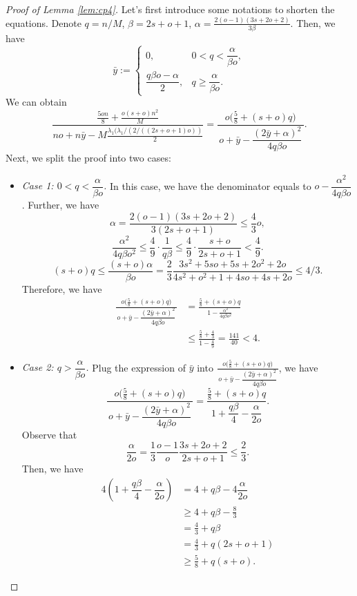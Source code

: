 \documentclass[10pt,a4paper]{amsart}
\begin{document}
\begin{proof}[Proof of Lemma \ref{lem:cp4}]
    Let's first introduce some notations to shorten the equations. Denote $q=n/M$, $\beta=2s+o+1$, $\alpha = \frac{2(o-1)(3s+2o+2)}{3\beta}$. Then, we have 
    $$
    \bar y :=
\begin{cases}
0, & 0<q<\dfrac{\alpha}{\beta o},\\[6pt]
\dfrac{q\beta o-\alpha}{2}, & q\ge \dfrac{\alpha}{\beta o}.
\end{cases} $$ 
We can obtain
\[
\frac{\frac{5 o n}{8}+\frac{o(s+o)n^2}{M}}{no + n \bar y - M \frac{\lambda_1(\lambda_1/(2/((2s+o+1)o))}{2}} = \frac{o\bigl(\tfrac58 +(s+o)q\bigr)}
        {\,o+\bar y-
          \dfrac{(2\bar y+\alpha)^{2}}{4q\beta o}\,}.
\]
Next, we split the proof into two cases:
\begin{itemize}
    \item \textit{Case 1: $0<q<\dfrac{\alpha}{\beta o}$. } In this case, we have the denominator equals to $o-
          \dfrac{\alpha^{2}}{4q\beta o}$. Further, we have
    \[
    \alpha = \frac{2(o-1)(3s+2o+2)}{3(2s+o+1)} \leq \frac{4}{3}o, 
    \]
    \[
    \frac{\alpha^{2}}{4q\beta o^{2}}
     \le\frac{4}{9}\cdot\frac1{q\beta}
     \le\frac49\cdot\frac{s+o}{2s+o+1}<\frac49.
    \]
    \[
    (s+o)q \leq \frac{(s+o)\alpha}{\beta o} = \frac{2}{3} \frac{3s^2+5so+5s+2o^2+2o}{4s^2+o^2+1+4so+4s+2o} \leq 4/3.
    \]
    Therefore, we have
    \begin{align*}
        \frac{o\bigl(\tfrac58 +(s+o)q\bigr)}
        {\,o+\bar y-
          \dfrac{(2\bar y+\alpha)^{2}}{4q\beta o}\,} &= \frac{\tfrac58 +(s+o)q}{1-\frac{\alpha^{2}}{4q\beta o^{2}}} \\&\leq \frac{\tfrac58 + \tfrac43}{1-\tfrac49} = \frac{141}{40} < 4.
    \end{align*}
    \item \textit{Case 2: $q>\dfrac{\alpha}{\beta o}$. } Plug the expression of $\bar y$ into $\frac{o\bigl(\tfrac58 +(s+o)q\bigr)}
        {\,o+\bar y-
          \dfrac{(2\bar y+\alpha)^{2}}{4q\beta o}\,}$, we have 
          \[
          \frac{o\bigl(\tfrac58 +(s+o)q\bigr)}
        {\,o+\bar y-
          \dfrac{(2\bar y+\alpha)^{2}}{4q\beta o}\,} = \frac{\tfrac58+(s+o)q}
       {\,1+\dfrac{q\beta}{4}-\dfrac{\alpha}{2o}\,}.
          \]
    Observe that 
    \[
    \frac{\alpha}{2o} = \frac{1}{3} \frac{o-1}{o} \frac{3s+2o+2}{2s+o+1} \leq \frac{2}{3}.
    \]
    Then, we have
    \begin{align*}
        4 \left(1+\dfrac{q\beta}{4}-\dfrac{\alpha}{2o} \right) &= 4 + q \beta - 4 \dfrac{\alpha}{2o} \\&\geq 4 + q \beta - \frac{8}{3} \\&= \frac{4}{3} + q \beta \\&= \frac{4}{3} + q (2s+o+1) \\&\geq \frac{5}{8} + q(s+o).
    \end{align*}
\end{itemize}
\end{proof}
\end{document}
